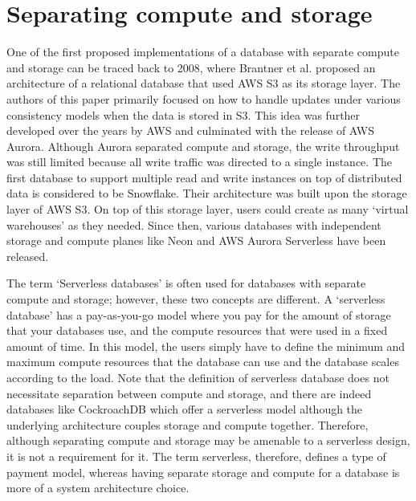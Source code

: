 \section{Separating compute and storage}\label{sec:serverlessArch}
One of the first proposed implementations of a database with separate compute and
storage can be traced back to 2008\cite{brantner2008building}, where Brantner et
al. proposed an architecture of a relational database that used AWS S3 as its
storage layer. The authors of this paper primarily focused on how to handle
updates under various consistency models when the data is stored in S3. This
idea was further developed over the years by AWS and culminated with the release
of AWS Aurora\cite{verbitski2017amazon}. Although Aurora separated compute and
storage, the write throughput was still limited because all write
traffic was directed to a single instance. The first database to support
multiple read and write instances on top of distributed data is considered to be
Snowflake\cite{dageville2016snowflake}. Their architecture was built upon the
storage layer of AWS S3. On top of this storage layer, users could create as many `virtual
warehouses' as they needed. Since then, various databases with independent
storage and compute planes like Neon\cite{neonPostgres} and AWS Aurora
Serverless\cite{auroraServerless} have been released.

\medskip
The term `Serverless databases' is often used for databases with separate
compute and storage; however, these two concepts are different. A `serverless
database' has a pay-as-you-go model where you pay for the amount of storage that
your databases use, and the compute resources that were used in a fixed amount
of time. In this model, the users simply have to define the minimum and maximum
compute resources that the database can use and the database scales according
to the load. Note that the definition of serverless database does not
necessitate separation between compute and storage, and there are indeed
databases like CockroachDB\cite{taft2020cockroachdb} which offer a serverless
model although the underlying architecture couples storage and compute together.
Therefore, although separating compute and storage may be amenable to a
serverless design, it is not a requirement for it. The term serverless,
therefore, defines a type of payment model, whereas having separate storage and
compute for a database is more of a system architecture choice. 

